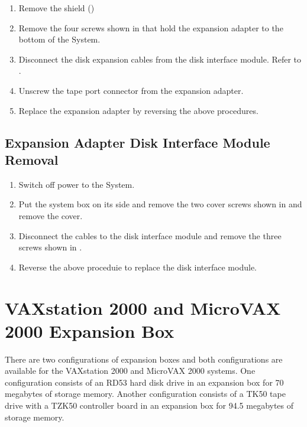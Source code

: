\begin{enumerate}
\item	Remove the shield ()
\item	Remove the four screws shown in  that hold the expansion
		adapter to the bottom of the System.
\newpage
\item	Disconnect the disk expansion cables from the disk interface module.
		Refer to .
\item	Unscrew the tape port connector from the expansion adapter.
\item	Replace the expansion adapter by reversing the above procedures.
\end{enumerate}
\newpage

\subsection{Expansion Adapter Disk Interface Module Removal}

\begin{enumerate}
\item	Switch off power to the System.

\item	Put the system box on its side and remove the two cover screws shown
		in  and remove the cover.

\newpage
\item	Disconnect the cables to the disk interface module and remove the three
		screws shown in .

\item	Reverse the above proceduie to replace the disk interface module.
\end{enumerate}
\newpage

\section{VAXstation 2000 and MicroVAX 2000 Expansion Box}

There are two configurations of expansion boxes and both configurations
are available for the VAXstation 2000 and MicroVAX 2000 systems. One
configuration consists of an RD53 hard disk drive in an expansion box
for 70 megabytes of storage memory. Another configuration consists of
a TK50 tape drive with a TZK50 controller board in an expansion box for
94.5 megabytes of storage memory.

